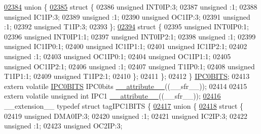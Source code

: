\begin{DoxyCode}
\hypertarget{a00015_source_l02384}{}\hyperlink{a00015}{02384}   \textcolor{keyword}{union }\{
\hypertarget{a00015_source_l02385}{}\hyperlink{a00015}{02385}     \textcolor{keyword}{struct }\{
02386       \textcolor{keywordtype}{unsigned} INT0IP:3;
02387       \textcolor{keywordtype}{unsigned} :1;
02388       \textcolor{keywordtype}{unsigned} IC1IP:3;
02389       \textcolor{keywordtype}{unsigned} :1;
02390       \textcolor{keywordtype}{unsigned} OC1IP:3;
02391       \textcolor{keywordtype}{unsigned} :1;
02392       \textcolor{keywordtype}{unsigned} T1IP:3;
02393     \};
\hypertarget{a00015_source_l02394}{}\hyperlink{a00015}{02394}     \textcolor{keyword}{struct }\{
02395       \textcolor{keywordtype}{unsigned} INT0IP0:1;
02396       \textcolor{keywordtype}{unsigned} INT0IP1:1;
02397       \textcolor{keywordtype}{unsigned} INT0IP2:1;
02398       \textcolor{keywordtype}{unsigned} :1;
02399       \textcolor{keywordtype}{unsigned} IC1IP0:1;
02400       \textcolor{keywordtype}{unsigned} IC1IP1:1;
02401       \textcolor{keywordtype}{unsigned} IC1IP2:1;
02402       \textcolor{keywordtype}{unsigned} :1;
02403       \textcolor{keywordtype}{unsigned} OC1IP0:1;
02404       \textcolor{keywordtype}{unsigned} OC1IP1:1;
02405       \textcolor{keywordtype}{unsigned} OC1IP2:1;
02406       \textcolor{keywordtype}{unsigned} :1;
02407       \textcolor{keywordtype}{unsigned} T1IP0:1;
02408       \textcolor{keywordtype}{unsigned} T1IP1:1;
02409       \textcolor{keywordtype}{unsigned} T1IP2:1;
02410     \};
02411   \};
02412 \} \hyperlink{a00014_dd/d4d/a00519}{IPC0BITS};
02413 \textcolor{keyword}{extern} \textcolor{keyword}{volatile} \hyperlink{a00014_dd/d4d/a00519}{IPC0BITS} IPC0bits \hyperlink{a00015_a493c46f03454991ccc5aa7a6e1dfb2a7}{\_\_attribute\_\_}((\_\_sfr\_\_));
02414 
02415 \textcolor{keyword}{extern} \textcolor{keyword}{volatile} \textcolor{keywordtype}{unsigned} \textcolor{keywordtype}{int}  IPC1 \hyperlink{a00015_a493c46f03454991ccc5aa7a6e1dfb2a7}{\_\_attribute\_\_}((\_\_sfr\_\_));
\hypertarget{a00015_source_l02416}{}\hyperlink{a00014}{02416} \_\_extension\_\_ \textcolor{keyword}{typedef} \textcolor{keyword}{struct }tagIPC1BITS \{
\hypertarget{a00015_source_l02417}{}\hyperlink{a00015}{02417}   \textcolor{keyword}{union }\{
\hypertarget{a00015_source_l02418}{}\hyperlink{a00015}{02418}     \textcolor{keyword}{struct }\{
02419       \textcolor{keywordtype}{unsigned} DMA0IP:3;
02420       \textcolor{keywordtype}{unsigned} :1;
02421       \textcolor{keywordtype}{unsigned} IC2IP:3;
02422       \textcolor{keywordtype}{unsigned} :1;
02423       \textcolor{keywordtype}{unsigned} OC2IP:3;

\end{DoxyCode}

